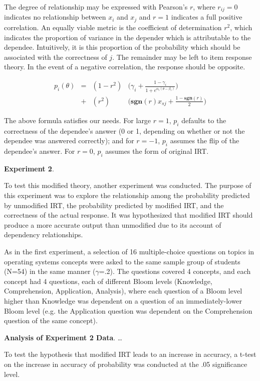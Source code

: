 \documentclass[a4paper,twocolumn]{article}
\begin{document}
The degree of relationship may be expressed with Pearson's $r$, where
$r_{ij}=0$ indicates no relationship between $x_i$ and $x_j$ and $r=1$
indicates a full positive correlation.  An equally viable metric is the
coefficient of determination $r^2$, which indicates the proportion of variance
in the depender which is attributable to the dependee.  Intuitively, it is
this proportion of the probability which should be associated with the
correctness of $j$.  The remainder may be left to item response theory.
In the event of a negative correlation, the response should be opposite.


\begin{align*}
  p_i(\theta) &=& (1-r^2) & \Big(\gamma_i + \frac{1-\gamma_i}{1+e^{\alpha_i(\theta-\beta_i)}}\Big) \\
              &+& (r^2)   & \Big(\mathbf{sgn}(r)x_{sj}+\frac{1-\mathbf{sgn}(r)}{2}\Big)
\end{align*}

The above formula satisfies our needs.  For large $r=1$, $p_i$ defaults to the
correctness of the dependee's answer (0 or 1, depending on whether or not the
dependee was answered correctly);  and for $r=-1$, $p_i$ assumes the flip of
the dependee's answer.  For $r=0$, $p_i$ assumes the form of original IRT.  


\textbf{Experiment 2}. 

To test this modified theory, another experiment was conducted.  The purpose of
this experiment was to explore the relationship among the probability predicted
by unmodified IRT, the probability predicted by modified IRT, and the
correctness of the actual response.  It was hypothesized that modified IRT
should produce a more accurate output than unmodified due to its account of
dependency relationships.

As in the first experiment, a selection of 16 multiple-choice questions on
topics in operating systems concepts were asked to the same sample group of
students (N=54) in the same manner ($\gamma$=.2).  The questions covered 4
concepts, and each concept had 4 questions, each of different Bloom levels
(Knowledge, Comprehension, Application, Analysis), where each question of a
Bloom level higher than Knowledge was dependent on a question of an
immediately-lower Bloom level (e.g. the Application question was dependent on
the Comprehension question of the same concept).


\textbf{Analysis of Experiment 2 Data}. \ldots

To test the hypothesis that modified IRT leads to an increase in accuracy,
a t-test on the increase in accuracy of probability was conducted at the
.05 significance level.
\end{document}
